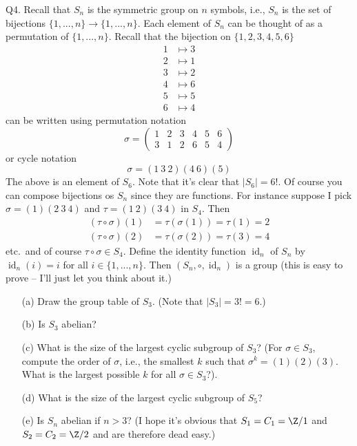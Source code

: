 \newpage
Q4.
Recall that $S_n$ is the symmetric group on $n$ symbols, i.e.,
$S_n$ is the set of bijections $\{1,...,n\}\rightarrow\{1,...,n\}$.
Each element of $S_n$ can be thought of as a permutation of $\{1,...,n\}$.
Recall that the bijection on $\{1, 2, 3, 4, 5, 6\}$
\begin{align*}
1 &\mapsto 3 \\
2 &\mapsto 1 \\
3 &\mapsto 2 \\
4 &\mapsto 6 \\
5 &\mapsto 5 \\
6 &\mapsto 4 
\end{align*}
can be written using permutation notation
\[
\sigma = 
\begin{pmatrix}
1 & 2 & 3 & 4 & 5 & 6 \\
3 & 1 & 2 & 6 & 5 & 4
\end{pmatrix}
\]
or cycle notation
\[
\sigma = (1 \ 3 \ 2) (4 \ 6) (5)
\]
The above is an element of $S_6$.
Note that it's clear that $|S_6| = 6!$.
Of course you can compose bijections os $S_n$ since they are functions.
For instance
suppose I pick $\sigma=(1)(2 \ 3 \ 4)$ and $\tau = (1 \ 2)(3 \ 4)$ in
$S_4$.
Then
\begin{align*}
(\tau \circ \sigma)(1) &= \tau(\sigma(1)) = \tau(1) = 2 \\
(\tau \circ \sigma)(2) &= \tau(\sigma(2)) = \tau(3) = 4 
\end{align*}
etc.~and of course $\tau \circ \sigma \in S_4$.
Define the identity function $\operatorname{id}_n$ of $S_n$ by
$\operatorname{id}_n(i) = i$ for all $i \in \{1,...,n\}$.
Then $(S_n, \circ, \operatorname{id}_n)$ is a group (this is easy to prove --
I'll just let you think about it.)

\begin{enumerate}[nosep]

\item[(a)]
Draw the group table of $S_3$. (Note that $|S_3| = 3! = 6$.)

\item[(b)]
Is $S_3$ abelian?

\item[(c)]
What is the size of the largest cyclic subgroup of $S_3$?
(For $\sigma \in S_3$, compute the order of $\sigma$, i.e., the smallest $k$ such that
$\sigma^k = (1)(2)(3)$. What is the largest possible $k$ for all $\sigma \in S_3$?).

\item[(d)] What is the size of the largest cyclic subgroup of $S_5$?

\item[(e)] Is $S_n$ abelian if $n > 3$? (I hope it's obvious that $S_1 = C_1 = \Z/1$ and $S_2 = C_2 = \Z/2$ and are
therefore dead easy.)

\end{enumerate}


